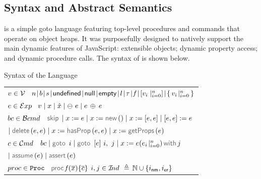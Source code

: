 \vspace*{-0.2cm}
\subsection{\jsil Syntax and Abstract Semantics}\label{subsec:jsil:analysis:formalism}

\vspace*{-0.1cm}
 \jsil is a simple goto language featuring top-level procedures and commands that operate on object heaps. It was purposefully designed to natively support the main dynamic features of JavaScript: extensible objects; dynamic property access; and dynamic procedure calls. The syntax of \jsil is shown below. 

\vspace{5pt}
\begin{display}{Syntax of the \jsil Language}{
\begin{tabular}{l}
$v \in \mathcal{V}$ \ $\jnumber \! \mid \! \jbool \! \mid \! \jstring \! \mid \! {\small \jundefined} \! \mid \! {\small \jnull} \! \mid \! {\small \jempty} \! \mid \! \loc \! \mid \! \jtype \! \mid \!  \pid \! 
         \mid \! \jsillist{\val_i \mid_{i=0}^n} \! \mid \! \jsilset{\val_i \!\mid_{i=0}^n}$
   \\[0.1cm]
  $e \in \mathcal{E}xp$ \ $v \mid x \mid \hat{x} \mid \ominus\ e \mid e \, \oplus_{} \, e$
 \\[0.1cm]
%
$bc \in \mathcal{B}cmd$ \ $\jsilskip \mid \jvar := \jsilexpr  \mid \jvar := \jsilnew() \mid \jvar := [\jsilexpr, \jsilexpr] \mid [\jsilexpr, \jsilexpr] := \jsilexpr $ \\
%
\hspace{0.02cm} $\mid \jsildelete(\jsilexpr, \jsilexpr) \mid \jvar := \hasfield(\jsilexpr, \jsilexpr) \mid \jvar := \getfields(\jsilexpr)$ \\[0.1cm]
$c \in \mathcal{C}md$  \ $ \bcmd \mid \goto \ i \mid  \ifgoto{\jsilexpr}{i}{j} \mid \jsilcall{\jvar}{\jsilexpr}{\jsilexpr_i\!\mid_{i=0}^n}{j}$ \\
\hspace{0.02cm} $ \mid \assume(\jsilexpr) \mid \jassert(\jsilexpr)$ \\[0.1cm]
%
$proc \in \mathtt{Proc}$  \ $\procedure{\pid}{\jvec{\jvar}}{\jvec{\jcmd}}$
\hspace{0.6cm}
$i, j \in \mathcal{I}\hspace{-2pt}nd$ $\,\triangleq\, \mathbb{N} \cup \{ i_{{\sf nm}}, i_{{\sf er}} \}$
 \end{tabular}}
\end{display}

